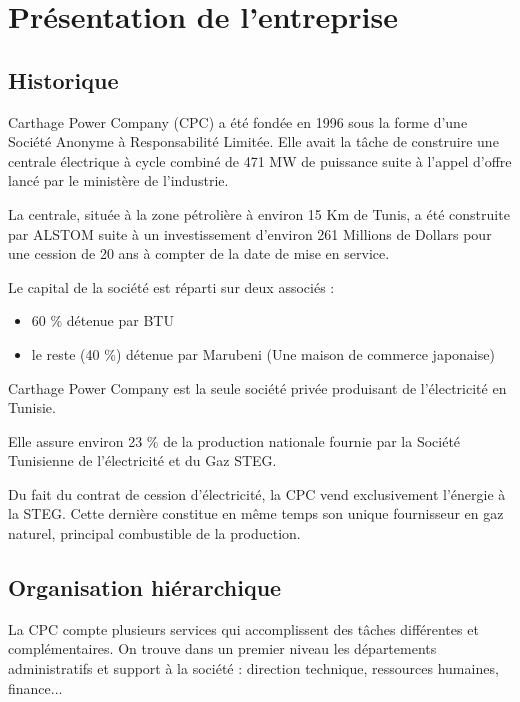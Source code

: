 \chapter{Présentation de l'entreprise}
\section{Historique}
Carthage Power Company (CPC) a été fondée en 1996 sous la forme d'une Société Anonyme à Responsabilité Limitée.
 Elle avait la tâche de construire une centrale électrique à cycle combiné de 471 MW de puissance suite à l'appel d'offre lancé par le ministère de l'industrie.
 
La centrale, située à la zone pétrolière  à environ 15 Km de Tunis, a été construite par ALSTOM suite à un investissement d'environ 261 Millions de Dollars pour une cession  de 20 ans à compter de la date de mise en service.

Le capital de la société est  réparti sur deux associés :

\begin{itemize}

\item 60 \% détenue par  BTU
\item le reste (40 \%) détenue par Marubeni (Une maison de commerce japonaise)

\end{itemize}

Carthage Power Company est la seule société privée produisant de l'électricité en Tunisie.

Elle assure environ  23 \% de la production nationale fournie par la Société Tunisienne de l'électricité et du Gaz STEG.

Du fait du contrat de cession d'électricité, la CPC vend exclusivement  l'énergie à la STEG. Cette dernière constitue en même temps son unique fournisseur en gaz naturel, principal combustible de la production.

\section{Organisation hiérarchique}

La CPC compte plusieurs services qui accomplissent des tâches différentes et complémentaires. On trouve dans un premier niveau les départements administratifs et support à la société : direction technique, ressources humaines, finance...

